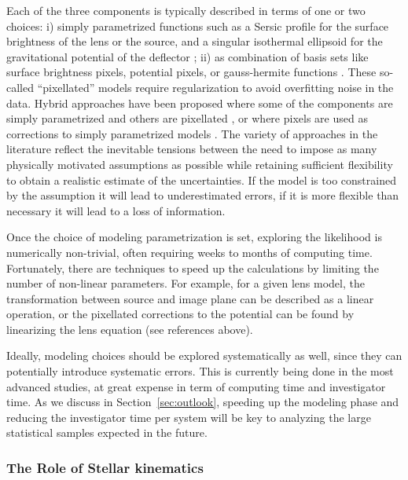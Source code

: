 Each of the three components is typically described in terms of one or
two choices: i) simply parametrized functions such as a Sersic profile
for the surface brightness of the lens or the source, and a singular
isothermal ellipsoid for the gravitational potential of the deflector
\citep{Kee11}; ii) as combination of basis sets like surface brightness
pixels, potential pixels, or gauss-hermite functions
\citep[e.g.][]{Col10, BirrerEtal2015, Nig++15}. These so-called
``pixellated'' models require regularization to avoid overfitting
noise in the data. Hybrid approaches have been proposed where some of
the components are simply parametrized and others are pixellated
\citep{W+D03,T+K04,Suy++06}, or where pixels are used as corrections to simply
parametrized models \citep{Koo05,V+K09,S+H10,Suy++10}. The variety of
approaches in the literature reflect the inevitable tensions between
the need to impose as many physically motivated assumptions as
possible while retaining sufficient flexibility to obtain a realistic
estimate of the uncertainties. If the model is too constrained by the
assumption it will lead to underestimated errors, if it is more
flexible than necessary it will lead to a loss of information.

Once the choice of modeling parametrization is set, exploring the
likelihood is numerically non-trivial, often requiring weeks to months
of computing time. Fortunately, there are techniques to speed up the
calculations by limiting the number of non-linear parameters. For
example, for a given lens model, the transformation between source and
image plane can be described as a linear operation, or the pixellated
corrections to the potential can be found by linearizing the lens
equation (see references above). 

Ideally, modeling choices should be explored systematically as well,
since they can potentially introduce systematic errors. This is
currently being done in the most advanced studies, at great expense in
term of computing time and investigator time. As we discuss in
Section~\ref{sec:outlook}, speeding up the modeling phase and reducing
the investigator time per system will be key to analyzing the large
statistical samples expected in the future.


\subsubsection{The Role of Stellar kinematics}

